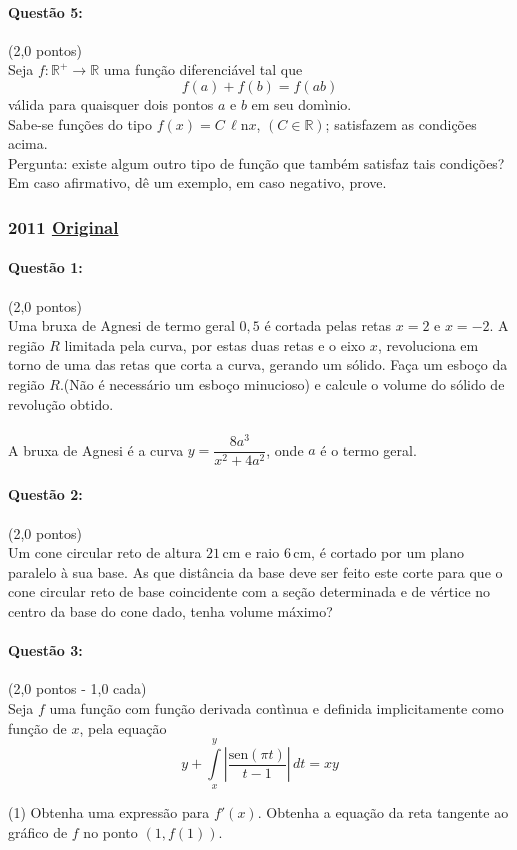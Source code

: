 \documentclass[12pt,a4paper]{article}
\newcommand{\R}{\mathbb{R}}
\newcommand{\sen}{\mathrm{sen}}
\newcommand{\Ln}{\ell\mathrm{n}}
\newcommand{\original}[1]{\tiny \href{#1}{Original} \normalsize}
\begin{document}
\paragraph{Questão 5:}(2,0 pontos)\\
Seja $f:\R^+ \to \R$ uma função diferenciável tal que
$$f(a)+f(b)=f(ab)$$
válida para quaisquer dois pontos $a$ e $b$ em seu domìnio.\\
Sabe-se funções do tipo $f(x)=C\,\Ln x$, $(C \in \R)$; satisfazem as condições acima.\\
Pergunta: existe algum outro tipo de função que também satisfaz tais condições?\\
Em caso afirmativo, dê um exemplo, em caso negativo, prove.

\newpage

\subsubsection{2011 \original{https://drive.google.com/open?id=1PTQE1whASIVeupcRjxuyAj5q5jsATNwX}}

\paragraph{Questão 1:}(2,0 pontos)\\
Uma bruxa de Agnesi de termo geral $0,5$ é cortada pelas retas $x=2$ e $x=-2$. A região $R$ limitada pela curva, por estas duas retas e o eixo $x$, revoluciona em torno de uma das retas que corta a curva, gerando um sólido. Faça um esboço da região $R$.(Não é necessário um esboço minucioso) e calcule o volume do sólido de revolução obtido.\\
\\
A bruxa de Agnesi é a curva $y=\dfrac{8a^3}{x^2+4a^2}$, onde $a$ é o termo geral.

\paragraph{Questão 2:}(2,0 pontos)\\
Um cone circular reto de altura $21\,$cm e raio $6\,$cm, é cortado por um plano paralelo à sua base. As que distância da base deve ser feito este corte para que o cone circular reto de base coincidente com a seção determinada e de vértice no centro da base do cone dado, tenha volume máximo?

\paragraph{Questão 3:}(2,0 pontos - 1,0 cada)\\
Seja $f$ uma função com função derivada contìnua e definida implicitamente como função de $x$, pela equação
$$y+\displaystyle\int\limits_{x}^{y}\left \vert \dfrac{\sen (\pi t)}{t-1}\right \vert \,dt=xy $$
\begin{tasks}(1)
\task Obtenha uma expressão para $f'(x)$.
\task Obtenha a equação da reta tangente ao gráfico de $f$ no ponto $(1,f(1))$.
\end{tasks}
\end{document}
